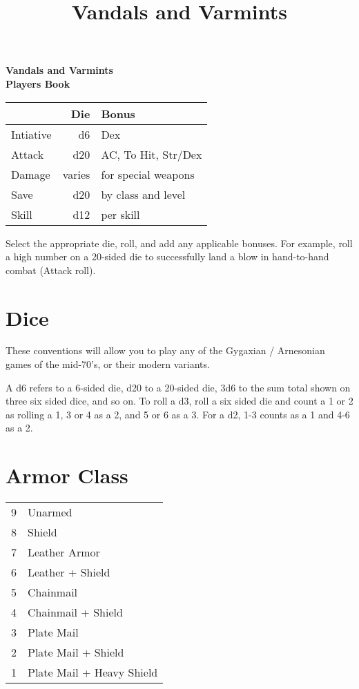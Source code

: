 \documentclass[12pt]{article}
\title{Vandals and Varmints}
\begin{document}
\thispagestyle{empty}
\begin{center}
\textbf{\Large Vandals and Varmints}\\
\textbf{Players Book}\\

\end{center}


\begin{tabular}{|l r|l|}
\hline
          &    Die & Bonus \\ \hline
Intiative &     d6 & Dex \\
Attack    &    d20 & AC, To Hit, Str/Dex \\
Damage    & varies & for special weapons \\
Save      &    d20 & by class and level \\
Skill     &    d12 & per skill \\
\hline
\end{tabular}

Select the appropriate die, roll, and add
any applicable bonuses.  For example, roll a
high number on a 20-sided die to successfully land a blow in
hand-to-hand combat (Attack roll).

\section{Dice}
These conventions will allow you to play any of the Gygaxian /
Arnesonian games of the mid-70's, or their modern variants.

A d6 refers to a 6-sided die, d20 to a 20-sided die, 3d6 to the sum
total shown on three six sided dice, and so on. To roll a d3, roll a
six sided die and count a 1 or 2 as rolling a 1, 3 or 4 as a 2, and 5 or 6
as a 3. For a d2, 1-3 counts as a 1 and 4-6 as a 2.

\section{Armor Class}

\begin{tabular}{l|l}
9 & Unarmed \\
8 & Shield \\
7 & Leather Armor \\
6 & Leather + Shield \\
5 & Chainmail \\
4 & Chainmail + Shield \\
3 & Plate Mail \\
2 & Plate Mail + Shield \\
1 & Plate Mail + Heavy Shield \\
\end{tabular}\\
\end{document}
